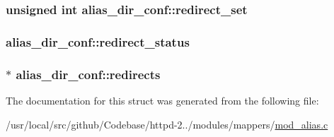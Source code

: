 \subsubsection[{\texorpdfstring{redirect\+\_\+set}{redirect_set}}]{\setlength{\rightskip}{0pt plus 5cm}unsigned {\bf int} alias\+\_\+dir\+\_\+conf\+::redirect\+\_\+set}\hypertarget{structalias__dir__conf_a39f14fb72a8ab515d9ab7b292de06afb}{}\label{structalias__dir__conf_a39f14fb72a8ab515d9ab7b292de06afb}
\subsubsection[{\texorpdfstring{redirect\+\_\+status}{redirect_status}}]{ alias\+\_\+dir\+\_\+conf\+::redirect\+\_\+status}\hypertarget{structalias__dir__conf_a454cc81e681925db5ffa105bb95b9890}{}\label{structalias__dir__conf_a454cc81e681925db5ffa105bb95b9890}
\subsubsection[{\texorpdfstring{redirects}{redirects}}]{$\ast$ alias\+\_\+dir\+\_\+conf\+::redirects}\hypertarget{structalias__dir__conf_a4fcfde9c70295bbe87adc2664dd620eb}{}\label{structalias__dir__conf_a4fcfde9c70295bbe87adc2664dd620eb}


The documentation for this struct was generated from the following file\+:\begin{DoxyCompactItemize}
\item 
/usr/local/src/github/\+Codebase/httpd-\/2../modules/mappers/\hyperlink{mod__alias_8c}{mod\+\_\+alias.\+c}\end{DoxyCompactItemize}
